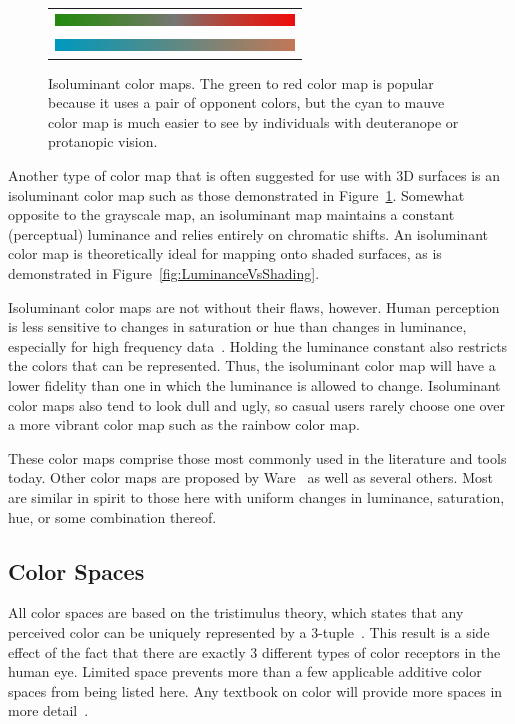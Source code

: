 \documentclass{acmsiggraph}               %
\newcommand{\lcite}[1]{~\cite{#1}}
\newcommand{\scite}[1]{~\shortcite{#1}}
\begin{document}
\begin{figure}
  \centering
  \begin{tabular}{c}
    \includegraphics[width=2.5in]{images/Green2RedBar} \\
    \includegraphics[width=2.5in]{images/Cyan2MauveBar}
  \end{tabular}
  \caption{Isoluminant color maps.  The green to red color map is popular
    because it uses a pair of opponent colors, but the cyan to mauve color
    map is much easier to see by individuals with deuteranope or protanopic
    vision.}
  \label{fig:IsoluminantColorMap}
\end{figure}
Another type of color map that is often suggested for use with 3D surfaces
is an isoluminant color map such as those demonstrated in
Figure~\ref{fig:IsoluminantColorMap}.  Somewhat opposite to the grayscale
map, an isoluminant map maintains a constant (perceptual) luminance and
relies entirely on chromatic shifts.  An isoluminant color map is
theoretically ideal for mapping onto shaded surfaces, as is demonstrated in
Figure~\ref{fig:LuminanceVsShading}.

Isoluminant color maps are not without their flaws, however.  Human
perception is less sensitive to changes in saturation or hue than changes
in luminance, especially for high frequency data\lcite{Rogowitz96}.
Holding the luminance constant also restricts the colors that can be
represented.  Thus, the isoluminant color map will have a lower fidelity
than one in which the luminance is allowed to change.  Isoluminant color
maps also tend to look dull and ugly, so casual users rarely
choose one over a more vibrant color map such as the rainbow color map.

These color maps comprise those most commonly used in the literature and tools
today.  Other color maps are proposed by Ware\scite{Ware04} as well as
several others.  Most are similar in spirit to those here with uniform
changes in luminance, saturation, hue, or some combination thereof.

\subsection{Color Spaces}
\label{sec:PreviousWork:ColorSpaces}

All color spaces are based on the tristimulus theory, which states that any
perceived color can be uniquely represented by a
3-tuple\lcite{Feynman63}.  This result is a side effect
of the fact that there are exactly 3 different types of color receptors in
the human eye.  Limited space prevents more than a few applicable additive
color spaces from being listed here.  Any textbook on color will provide
more spaces in more detail\lcite{Stone03,Wyszecki82}.
\end{document}
